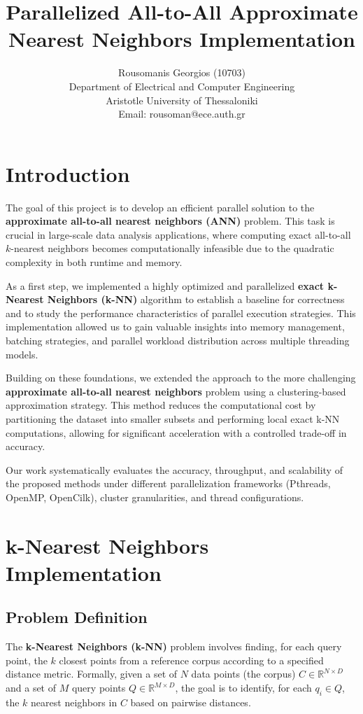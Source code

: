 \documentclass{article}
\title{Parallelized All-to-All Approximate Nearest Neighbors Implementation}
\author{Rousomanis Georgios (10703)\\
Department of Electrical and Computer Engineering\\
Aristotle University of Thessaloniki\\
Email: rousoman@ece.auth.gr
}
\begin{document}
\maketitle

\section*{Introduction}

The goal of this project is to develop an efficient parallel solution to the 
\textbf{approximate all-to-all nearest neighbors (ANN)} problem. This task is crucial in 
large-scale data analysis applications, where computing exact all-to-all $k$-nearest neighbors 
becomes computationally infeasible due to the quadratic complexity in both runtime and memory. 

As a first step, we implemented a highly optimized and parallelized 
\textbf{exact k-Nearest Neighbors (k-NN)} algorithm to establish a baseline for correctness and 
to study the performance characteristics of parallel execution strategies. This implementation 
allowed us to gain valuable insights into memory management, batching strategies, and parallel 
workload distribution across multiple threading models.

Building on these foundations, we extended the approach to the more challenging 
\textbf{approximate all-to-all nearest neighbors} problem using a clustering-based approximation 
strategy. This method reduces the computational cost by partitioning the dataset into smaller 
subsets and performing local exact k-NN computations, allowing for significant acceleration
with a controlled trade-off in accuracy.

Our work systematically evaluates the accuracy, throughput, and scalability of the proposed 
methods under different parallelization frameworks (Pthreads, OpenMP, OpenCilk), cluster 
granularities, and thread configurations.

\section{k-Nearest Neighbors Implementation}

\subsection{Problem Definition}

The \textbf{k-Nearest Neighbors (k-NN)} problem involves finding, for each query point, the $k$ 
closest points from a reference corpus according to a specified distance metric. Formally, given 
a set of $N$ data points (the corpus) $C \in \mathbb{R}^{N \times D}$ and a set of $M$ query 
points $Q \in \mathbb{R}^{M \times D}$, the goal is to identify, for each $q_i \in Q$, the $k$ 
nearest neighbors in $C$ based on pairwise distances.
\end{document}
